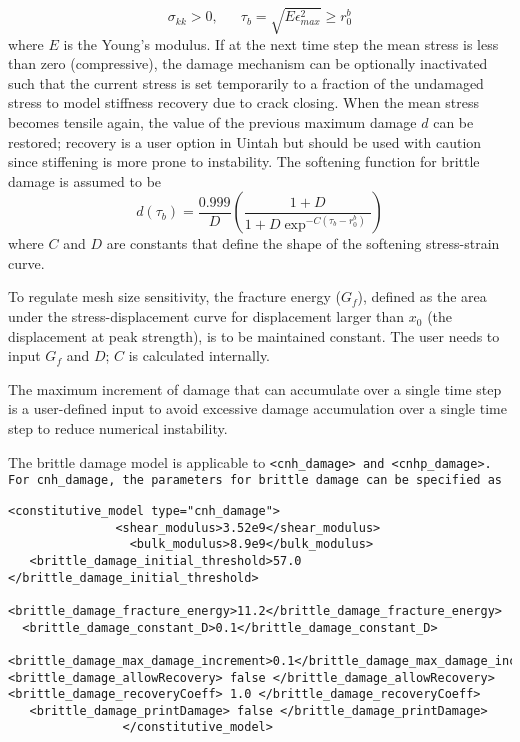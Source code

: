 \begin{enumerate}
\begin{equation}
\sigma_{kk}>0, \phantom{ijkl}
\tau_b = \sqrt{E \epsilon_{max}^2} \geq r_0^b
\end{equation}
where $E$ is the Young's modulus. If at the next time step the mean stress is less than
zero (compressive), the damage mechanism can be optionally inactivated such that the current stress 
is set temporarily to a fraction of the undamaged stress to 
model stiffness recovery due to crack closing. When the mean stress becomes tensile again,
the value of the previous maximum damage $d$ can be restored; recovery is a user option in Uintah
but should be used with caution since stiffening is more prone to instability.
The softening function for brittle damage is assumed to be
\begin{equation}
d(\tau_b)= \frac{0.999}{D} \left(\frac{1+D}{1+D \exp^{-C(\tau_b-r_0^b)}} \right)
\end{equation}
where $C$ and $D$ are constants that define the shape of the softening
stress-strain curve.
  
To regulate mesh size sensitivity, the fracture energy
($G_f$), defined as the area under the stress-displacement
curve for displacement larger than $x_0$ (the displacement at peak strength), is to be maintained constant.
The user needs to input $G_f$ and $D$; $C$ is calculated internally. 

The maximum increment of damage that can accumulate over a single time
step is a user-defined input to avoid excessive damage accumulation over
a single time step to reduce numerical instability.

The brittle damage model is applicable to \tt <cnh\_damage> \normalfont and 
\tt <cnhp\_damage>. \normalfont For \tt cnh\_damage, \normalfont 
the parameters for brittle damage can be specified as

\begin{Verbatim}[fontsize=\footnotesize]
                <constitutive_model type="cnh_damage">
               <shear_modulus>3.52e9</shear_modulus>
                 <bulk_modulus>8.9e9</bulk_modulus>
   <brittle_damage_initial_threshold>57.0 </brittle_damage_initial_threshold>
  <brittle_damage_fracture_energy>11.2</brittle_damage_fracture_energy>
  <brittle_damage_constant_D>0.1</brittle_damage_constant_D>
 <brittle_damage_max_damage_increment>0.1</brittle_damage_max_damage_increment>
<brittle_damage_allowRecovery> false </brittle_damage_allowRecovery>
<brittle_damage_recoveryCoeff> 1.0 </brittle_damage_recoveryCoeff>
   <brittle_damage_printDamage> false </brittle_damage_printDamage>
                </constitutive_model>


\end{Verbatim}
\end{enumerate}
